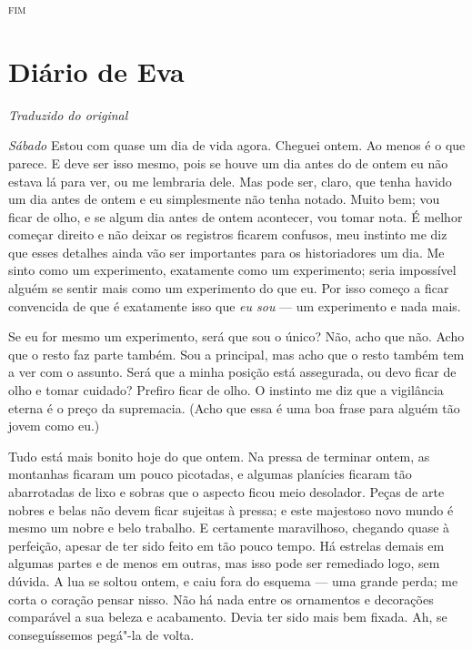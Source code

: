 \begin{center}
\textsc{fim}
\end{center}




\chapter{Diário de Eva}
\medskip

{\small
\hfill\textit{Traduzido do original}
}
\break

\noindent\textit{Sábado} Estou com quase um dia de vida agora. Cheguei ontem. Ao menos é o que parece. E deve ser isso mesmo, pois se houve um dia antes do de ontem
eu não estava lá para ver, ou me lembraria dele. Mas pode ser, claro, que tenha
havido um dia antes de ontem e eu simplesmente não tenha notado. Muito
bem; vou ficar de olho, e se algum dia antes de ontem acontecer, vou tomar
nota. É melhor começar direito e não deixar os registros ficarem confusos,
meu instinto me diz que esses detalhes ainda vão ser importantes para os
historiadores um dia. Me sinto como um experimento, exatamente como um
experimento; seria impossível alguém se sentir mais como um experimento do que
eu. Por isso começo a ficar convencida de que é exatamente isso que \textit{eu sou} --- um
experimento e nada mais.

Se eu for mesmo um experimento, será que sou o único? Não, acho que não. Acho que o
resto faz parte também. Sou a principal, mas acho que o resto também tem a ver
com o assunto. Será que a minha posição está assegurada, ou devo ficar de olho e
tomar cuidado? Prefiro ficar de olho. O instinto me diz que a vigilância
eterna é o preço da supremacia. (Acho que essa é uma boa frase para alguém tão
jovem como eu.)

Tudo está mais bonito hoje do que ontem. Na pressa de terminar ontem, as
montanhas ficaram um pouco picotadas, e algumas planícies ficaram tão
abarrotadas de lixo e sobras que o aspecto ficou meio desolador. Peças de arte
nobres e belas não devem ficar sujeitas à pressa; e este majestoso novo mundo é
mesmo um nobre e belo trabalho. E certamente maravilhoso, chegando quase à
perfeição, apesar de ter sido feito em tão pouco tempo. Há estrelas demais em algumas partes
e de menos em outras, mas isso pode ser remediado logo, sem dúvida. A lua se
soltou ontem, e caiu fora do esquema --- uma grande perda; me corta o
coração pensar nisso. Não há nada entre os ornamentos e decorações
comparável a sua beleza e acabamento. Devia ter sido mais bem fixada. Ah, se
conseguíssemos pegá"-la de volta.

